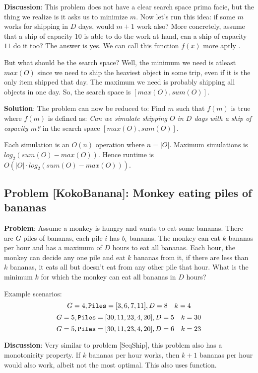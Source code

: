 \textbf{Discussion}: This problem does not have a clear search space prima facie, but the thing we realize is it asks us to minimize $m$. Now let's run this idea: if some $m$ works for shipping in $D$ days, would $m+1$ work also? More concretely, assume that a ship of capacity $10$ is able to do the work at hand, can a ship of capacity $11$ do it too? The answer is yes. We can call this function $f(x)$ more aptly .

But what should be the search space? Well, the minimum we need is atleast $max(O)$ since we need to ship the heaviest object in some trip, even if it is the only item shipped that day. The maximum we need is probably shipping all objects in one day. So, the search space is $[max(O), sum(O)]$.

\textbf{Solution}: The problem can now be reduced to: Find $m$ such that $f(m)$ is true where $f(m)$ is defined as: \textit{Can we simulate shipping $O$ in $D$ days with a ship of capacity $m$?} in the search space $[max(O), sum(O)]$.

Each simulation is an $O(n)$ operation where $n = |O|$. Maximum simulations is $log_2(sum(O) - max(O))$. Hence runtime is $O(|O| \cdot log_2(sum(O) - max(O)))$.

\subsection{Problem [KokoBanana]: Monkey eating piles of bananas}
\textbf{Problem}: Assume a monkey is hungry and wants to eat some bananas. There are $G$ piles of bananas, each pile $i$ has $b_i$ bananas. The monkey can eat $k$ bananas per hour and has a maximum of $D$ hours to eat all bananas. Each hour, the monkey can decide any one pile and eat $k$ bananas from it, if there are less than $k$ bananas, it eats all but doesn't eat from any other pile that hour. What is the minimum $k$ for which the monkey can eat all bananas in $D$ hours?

Example scenarios:
$$
G = 4, \verb|Piles| = [3, 6, 7, 11], D = 8 \quad k = 4
$$
$$
G = 5, \verb|Piles| = [30, 11, 23, 4, 20], D = 5 \quad k = 30
$$
$$
G = 5, \verb|Piles| = [30, 11, 23, 4, 20], D = 6 \quad k = 23
$$

\textbf{Discussion}: Very similar to problem [SeqShip], this problem also has a monotonicity property. If $k$ bananas per hour works, then $k+1$ bananas per hour would also work, albeit not the most optimal. This also uses  function.

